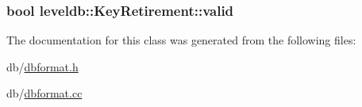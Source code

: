 \subsubsection[{valid}]{\setlength{\rightskip}{0pt plus 5cm}bool leveldb\+::\+Key\+Retirement\+::valid\hspace{0.3cm}{\ttfamily [protected]}}\label{classleveldb_1_1_key_retirement_a0d0ec2056ba235eb23f44b9ac1ebdec9}


The documentation for this class was generated from the following files\+:\begin{DoxyCompactItemize}
\item 
db/\hyperlink{dbformat_8h}{dbformat.\+h}\item 
db/\hyperlink{dbformat_8cc}{dbformat.\+cc}\end{DoxyCompactItemize}
